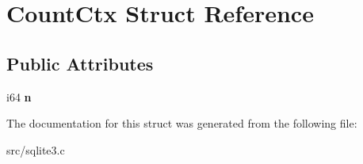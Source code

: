 \hypertarget{struct_count_ctx}{\section{Count\-Ctx Struct Reference}
\label{struct_count_ctx}
}
\subsection*{Public Attributes}
\begin{DoxyCompactItemize}
\item 
\hypertarget{struct_count_ctx_a141c718918dbfaa183f772bfd7a516f4}{i64 {\bfseries n}}\label{struct_count_ctx_a141c718918dbfaa183f772bfd7a516f4}

\end{DoxyCompactItemize}


The documentation for this struct was generated from the following file\-:\begin{DoxyCompactItemize}
\item 
src/sqlite3.\-c\end{DoxyCompactItemize}
